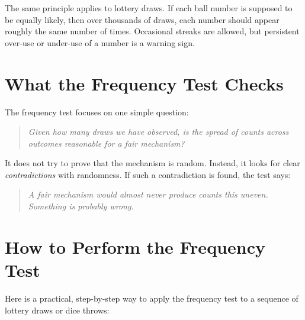 The same principle applies to lottery draws.  If each ball number is supposed to be equally likely, then over thousands of draws, each number should appear roughly the same number of times.  Occasional streaks are allowed, but persistent over-use or under-use of a number is a warning sign.

\section{What the Frequency Test Checks}
The frequency test focuses on one simple question:
\begin{quote}
  \emph{Given how many draws we have observed, is the spread of counts across outcomes reasonable for a fair mechanism?}
\end{quote}

It does not try to prove that the mechanism is random.  Instead, it looks for clear \emph{contradictions} with randomness.  If such a contradiction is found, the test says:
\begin{quote}
  \emph{A fair mechanism would almost never produce counts this uneven.  Something is probably wrong.}
\end{quote}

\section{How to Perform the Frequency Test}
Here is a practical, step-by-step way to apply the frequency test to a sequence of lottery draws or dice throws:

